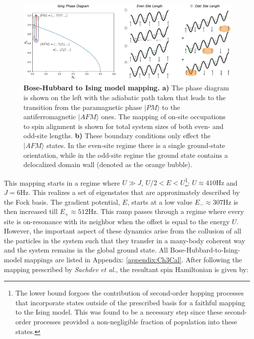 \begin{figure}[t!]
		\includegraphics[width=\columnwidth]{figures/ch3/ising_data/AFM_ising_map.pdf} 
		\caption{\textbf{Bose-Hubbard to Ising model mapping. a)}  The phase diagram is shown on the left with the adiabatic path taken that leads to the transition from the paramagnetic phase $|PM\rangle$ to the antiferromagnetic $|AFM\rangle$ ones. The mapping of on-site occupations to spin alignment is shown for total system sizes of both even- and odd-site lengths. \textbf{b)} These boundary conditions only effect the $|AFM\rangle$ states. In the even-site regime there is a single ground-state orientation, while in the odd-site regime the ground state contains a delocalized domain wall (denoted as the orange bubble).}
		\label{fig:IsingMap}	
\end{figure}


This mapping starts in a regime where $U\gg J$,  $U/2<E<U$\footnote{The lower bound forgoes the contribution of second-order hopping processes that incorporate states outside of the prescribed basis for a faithful mapping to the Ising model. This was found to be a necessary step since these second-order processes provided a non-negligible fraction of population into these states.}: $U\approx 410 \mathrm{Hz}$ and $J=6\mathrm{Hz}$. This realizes a set of eigenstates that are approximately described by the Fock basis. The gradient potential, $E$, starts at a low value $E_{-} \approx 307\mathrm{Hz}$ is then increased till $E_+\approx 512 \mathrm{Hz}$. This ramp passes through a regime where every site is on-resonance with its neighbor when the offset is equal to the energy $U$. However, the important aspect of these dynamics arise from the collusion of all the particles in the system such that they transfer in a many-body coherent way and the system remains in the global ground state.  All Bose-Hubbard-to-Ising-model mappings are listed in Appendix: \ref{appendix:Ch3Cal}. After following the mapping prescribed by \emph{Sachdev et al.}\cite{Sachdev2002}, the resultant spin Hamiltonian is given by: 


